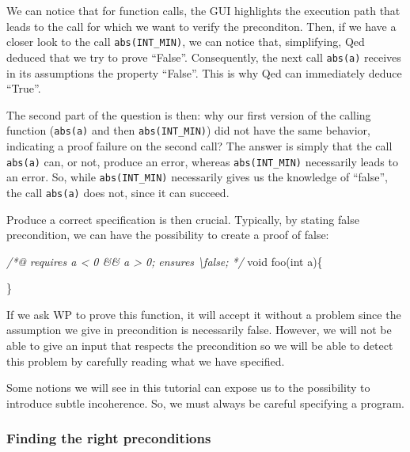 \documentclass[12pt,francais,]{scrbook}
\newenvironment{Shaded}{}{}
\newcommand{\DataTypeTok}[1]{\textcolor[rgb]{0.56,0.13,0.00}{{#1}}}
\newcommand{\CommentTok}[1]{\textcolor[rgb]{0.38,0.63,0.69}{\textit{{#1}}}}
\newcommand{\NormalTok}[1]{{#1}}
\begin{document}
We can notice that for function calls, the GUI highlights the execution
path that leads to the call for which we want to verify the preconditon.
Then, if we have a closer look to the call \texttt{abs(INT\_MIN)}, we
can notice that, simplifying, Qed deduced that we try to prove
``False''. Consequently, the next call \texttt{abs(a)} receives in its
assumptions the property ``False''. This is why Qed can immediately
deduce ``True''.

The second part of the question is then: why our first version of the
calling function (\texttt{abs(a)} and then \texttt{abs(INT\_MIN)}) did
not have the same behavior, indicating a proof failure on the second
call? The answer is simply that the call \texttt{abs(a)} can, or not,
produce an error, whereas \texttt{abs(INT\_MIN)} necessarily leads to an
error. So, while \texttt{abs(INT\_MIN)} necessarily gives us the
knowledge of ``false'', the call \texttt{abs(a)} does not, since it can
succeed.

Produce a correct specification is then crucial. Typically, by stating
false precondition, we can have the possibility to create a proof of
false:

\begin{footnotesize}\begin{Shaded}
\begin{Highlighting}[]
\CommentTok{/*@}
\CommentTok{  requires a < 0 && a > 0;}
\CommentTok{  ensures  \textbackslash{}false;}
\CommentTok{*/}
\DataTypeTok{void} \NormalTok{foo(}\DataTypeTok{int} \NormalTok{a)\{}

\NormalTok{\}}
\end{Highlighting}
\end{Shaded}\end{footnotesize}

If we ask WP to prove this function, it will accept it without a problem
since the assumption we give in precondition is necessarily false.
However, we will not be able to give an input that respects the
precondition so we will be able to detect this problem by carefully
reading what we have specified.

Some notions we will see in this tutorial can expose us to the
possibility to introduce subtle incoherence. So, we must always be
careful specifying a program.

\subsubsection{Finding the right
preconditions}\label{finding-the-right-preconditions}
\end{document}
